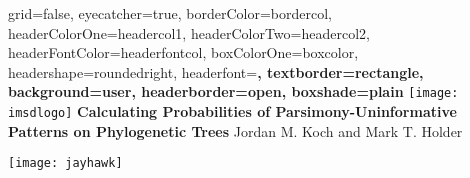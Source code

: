 \documentclass[a0paper,landscape]{baposter}
\begin{document}

\background{
}

\begin{poster}{
	grid=false,
	eyecatcher=true, 
	borderColor=bordercol,
	headerColorOne=headercol1,
	headerColorTwo=headercol2,
	headerFontColor=headerfontcol,
	boxColorOne=boxcolor,
	headershape=roundedright,
	headerfont=\Large\sf\bf,
	textborder=rectangle,
	background=user,
	headerborder=open,
  boxshade=plain
}
{
\texttt{[image: imsdlogo]}
}
{\bf
	Calculating Probabilities of Parsimony-Uninformative Patterns on Phylogenetic Trees
}
{
	\vspace{0em} Jordan M. Koch and Mark T. Holder\\
}
{

\setlength\fboxsep{0pt}
\setlength\fboxrule{0.5pt}
			\texttt{[image: jayhawk]}
}


\end{poster}
\end{document}
